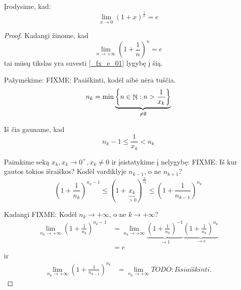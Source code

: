 \begin{exmp}
  Įrodysime, kad:
  \begin{equation}
    \lim _{x \to 0} (1 + x)^{\frac{1}{x}} = e
    \label{_fx_e_01}
  \end{equation}

  \begin{proof}
    Kadangi žinome, kad 
    \begin{equation*}
      \lim _{n \to +\infty} \left( 1 + \frac{1}{n} \right)^{n} = e
    \end{equation*}
    tai mūsų tikslas yra suvesti \ref{_fx_e_01} lygybę į šią.

    Pažymėkime: FIXME: Paaiškinti, kodėl aibė nėra tuščia.
    \begin{equation}
      n_{k} = \min \underbrace{\left\{ 
        n \in \mathop{\mathbb{N}} : n > \frac{1}{x_{k}} 
        \right\}}_{\neq \emptyset}
      \label{_fx_e_02}
    \end{equation}

    Iš čia gauname, kad
    \begin{equation}
      n_{k}-1 \leq \frac{1}{x_{k}} < n_{k}
      \label{_fx_e_03}
    \end{equation}

    Paimkime seką ${x_{k}}, x_{k} \to 0^{+}, x_{k} \neq 0$ ir įsistatykime
    į nelygybę: FIXME: Iš kur gautos tokios išraiškos? Kodėl 
    vardiklyje $n_{k-1}$, o ne $n_{k+1}$?
    \begin{equation}
      \left( 1 + \frac{1}{n_{k}} \right)^{n_{k}-1} 
      \leq (1 + \underbrace{x_{k}}_{> 0})^{\frac{1}{x_{k}}}
      \leq \left( 1 + \frac{1}{n_{k-1}} \right)^{n_{k}}
      \label{_fx_e_04}
    \end{equation}

    Kadangi FIXME: Kodėl $n_{k} \to +\infty$, o ne $k \to +\infty$?
    \begin{align*}
      \lim _{n_{k} \to +\infty} 
        \left( 1 + \frac{1}{n_{k}} \right)^{n_{k}-1} 
      &= \lim _{n_{k} \to +\infty} 
        \underbrace{\left( 1 + \frac{1}{n_{k}} \right)^{-1}}_{\to 1}
        \underbrace{\left( 1 + \frac{1}{n_{k}} \right)^{n_{k}}}_{\to e} \\
      &= e
    \end{align*}
    ir 
    \begin{align*}
      \lim _{n_{k} \to +\infty}
        \left( 1 + \frac{1}{n_{k-1}} \right)^{n_{k}}
      &= \lim _{n_{k} \to +\infty} TODO: Išsiaiškinti.
    \end{align*}

  \end{proof}
\end{exmp}

